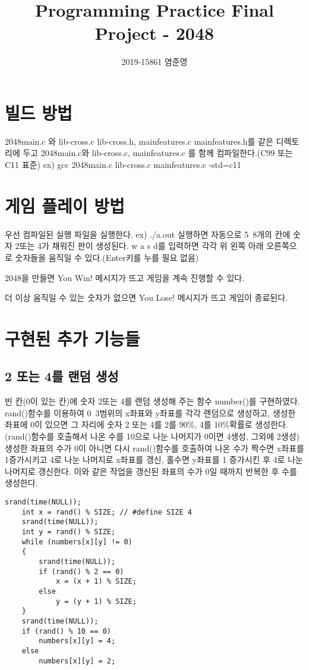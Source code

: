 \documentclass[a4paper]{article}
\author{2019-15861 염준영}
\date{}
\title{Programming Practice Final Project - 2048}
\renewenvironment{shaded}{%
  \def\FrameCommand{\fboxsep=\FrameSep \colorbox{shadecolor}}%
  \MakeFramed{\advance\hsize-\width \FrameRestore\FrameRestore}}%
 {\endMakeFramed}
\begin{document}
        \maketitle
        \tableofcontents
    \section{빌드 방법}
    2048main.c 와 lib-cross.c lib-cross.h, mainfeatures.c mainfeatures.h를 같은 디렉토리에 두고
    2048main.c와 lib-cross.c, mainfeatures.c 를 함께 컴파일한다.(C99 또는 C11 표준)
    \begin{shaded}
        ex) gcc 2048main.c lib-cross.c mainfeatures.c -std=c11
    \end{shaded}
    \section{게임 플레이 방법}
        우선 컴파일된 실행 파일을 실행한다.
        \begin{shaded}
            ex) ./a.out
        \end{shaded}
        실행하면 자동으로 5~8개의 칸에 숫자 2또는 4가 채워진 판이 생성된다. w a s d를 입력하면
        각각 위 왼쪽 아래 오른쪽으로 숫자들을 움직일 수 있다.(Enter키를 누를 필요 없음) 

        2048을 만들면 You Win! 메시지가 뜨고 게임을 계속 진행할 수 있다. 
        
        더 이상 움직일 수 있는 숫자가 없으면 You Lose! 메시지가 뜨고 게임이 종료된다.
    \section{구현된 추가 기능들}
    \subsection{2 또는 4를 랜덤 생성}
        빈 칸(0이 있는 칸)에 숫자 2또는 4를 랜덤 생성해 주는 함수 number()를 구현하였다.
        rand()함수를 이용하여 0~3범위의 x좌표와 y좌표를 각각 랜덤으로 생성하고, 생성한 좌표에 0이 있으면 그 자리에
        숫자 2 또는 4를 2를 90\%, 4를 10\%확률로 생성한다.(rand()함수를 호출해서 나온 수를 10으로 나눈 나머지가 0이면 4생성, 그외에 2생성)
        생성한 좌표의 수가 0이 아니면 다시 rand()함수를 호출하여 나온 수가 짝수면 x좌표를 1증가시키고 4로 나눈 나머지로 x좌표를 갱신,
        홀수면 y좌표를 1 증가시킨 후 4로 나눈 나머지로 갱신한다. 이와 같은 작업을 갱신된 좌표의 수가 0일 때까지 반복한 후 수를 생성한다.
            \begin{lstlisting}[style=CStyle]
    srand(time(NULL));
    int x = rand() % SIZE; // #define SIZE 4
    srand(time(NULL));
    int y = rand() % SIZE;
    while (numbers[x][y] != 0)
    {
    	srand(time(NULL));
        if (rand() % 2 == 0)
           	x = (x + 1) % SIZE;
        else
			y = (y + 1) % SIZE;
    }
    srand(time(NULL));
	if (rand() % 10 == 0)
    	numbers[x][y] = 4;
	else
		numbers[x][y] = 2;
            \end{lstlisting}
\end{document}
